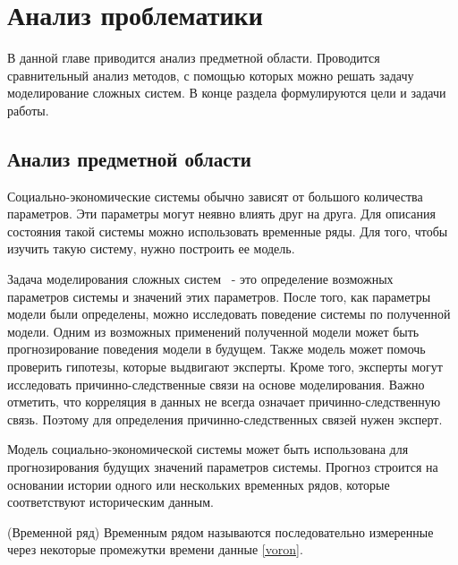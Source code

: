 

\chapter{Анализ проблематики }
\label{chapter1}

\begin{annotation}
	В данной главе приводится анализ предметной области.
	Проводится сравнительный анализ методов, с помощью которых
	можно решать задачу моделирование сложных систем.
	В конце раздела формулируются цели и задачи работы.
\end{annotation}


\section{Анализ предметной области}

Социально-экономические системы обычно зависят от большого количества параметров.
Эти параметры могут неявно влиять друг на друга. Для описания состояния такой системы
можно использовать временные ряды. Для того, чтобы изучить такую систему, нужно построить ее модель.

Задача моделирования сложных систем ~- это определение возможных параметров
системы и значений этих параметров. После того, как параметры модели были определены,
можно исследовать поведение системы по полученной модели. Одним из возможных
применений полученной модели может быть прогнозирование поведения модели в будущем.
Также модель может помочь проверить гипотезы, которые выдвигают эксперты.
Кроме того, эксперты могут исследовать причинно-следственные связи на основе моделирования.
Важно отметить, что корреляция в данных не всегда означает причинно-следственную связь.
Поэтому для определения причинно-следственных связей нужен эксперт.

Модель социально-экономической системы может быть использована
для прогнозирования будущих значений параметров системы. Прогноз строится на основании
истории одного или нескольких временных рядов, которые соответствуют историческим данным.

\begin{definition}
	(Временной ряд)
	Временным рядом называются последовательно измеренные через некоторые промежутки времени данные \ref{voron}.
\end{definition}


